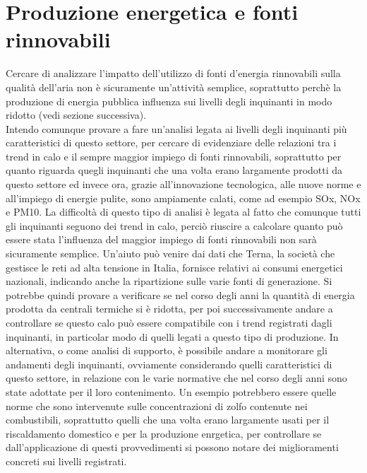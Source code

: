 \documentclass{article}
\begin{document}
\section{Produzione energetica e fonti rinnovabili}
Cercare di analizzare l'impatto dell'utilizzo di fonti d'energia rinnovabili sulla qualità dell'aria non è sicuramente un'attività semplice, soprattutto perchè la produzione di energia pubblica influenza sui livelli degli inquinanti in modo ridotto (vedi sezione successiva).
\\Intendo comunque provare a fare un'analisi legata ai livelli degli inquinanti più caratteristici di questo settore, per cercare di evidenziare delle relazioni tra i trend in calo e il sempre maggior impiego di fonti rinnovabili, soprattutto per quanto riguarda quegli inquinanti che una volta erano largamente prodotti da questo settore ed invece ora, grazie all'innovazione tecnologica, alle nuove norme e all'impiego di energie pulite, sono ampiamente calati, come ad esempio SOx, NOx e PM10.
La difficoltà di questo tipo di analisi è legata al fatto che comunque tutti gli inquinanti seguono dei trend in calo, perciò riuscire a calcolare quanto può essere stata l'influenza del maggior impiego di fonti rinnovabili non sarà sicuramente semplice. Un'aiuto può venire dai dati che Terna, la società che gestisce le reti ad alta tensione in Italia, fornisce relativi ai consumi energetici nazionali, indicando anche la ripartizione sulle varie fonti di generazione. Si potrebbe quindi provare a verificare se nel corso degli anni la quantità di energia prodotta da centrali termiche si è ridotta, per poi successivamente andare a controllare se questo calo può essere compatibile con i trend registrati dagli inquinanti, in particolar modo di quelli legati a questo tipo di produzione. In alternativa, o come analisi di supporto, è possibile andare a monitorare gli andamenti degli inquinanti, ovviamente considerando quelli caratteristici di questo settore, in relazione con le varie normative che nel corso degli anni sono state adottate per il loro contenimento. Un esempio potrebbero essere quelle norme che sono intervenute sulle concentrazioni di zolfo contenute nei combustibili, soprattutto quelli che una volta erano largamente usati per il riscaldamento domestico e per la produzione enrgetica, per controllare se dall'applicazione di questi provvedimenti si possono notare dei miglioramenti concreti sui livelli registrati. 
\end{document}
